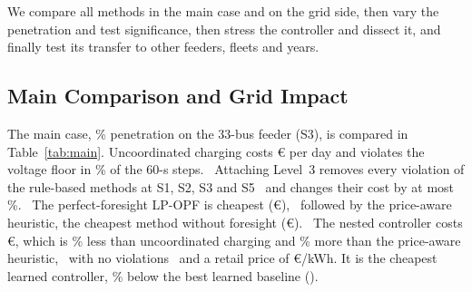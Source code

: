 
We compare all methods in the main case and on the grid side, then vary the
penetration and test significance, then stress the controller and dissect it,
and finally test its transfer to other feeders, fleets and years.

\begin{table}[t]
\centering
\caption{Results at S3 (240 Vehicles, 80\% Penetration; IEEE 33-Bus; \GEvalDays{} Held-Out Days; Learned Methods Averaged Over \GTrainSeedsWordCap{} Training Seeds). Cost: Mean Daily Cost With 95\% Bootstrap Confidence Interval; Cost/kWh and Retail in \euro/kWh; Other Metrics as Defined in Section~\ref{sec:metrics}; +L3: Level~3 Attached}
\label{tab:main}
\footnotesize

\end{table}

\subsection{Main Comparison and Grid Impact}
\label{sec:res-main}
The main case, \GPenSThree\% penetration on the 33-bus feeder (S3), is compared in
Table~\ref{tab:main}. Uncoordinated charging costs
\euro\GUncoordinatedSThreeCost{} per day and violates the voltage floor in
\GUncoordinatedSThreeViol\% of the 60-s steps.%
\ Attaching Level~3 removes every violation of the rule-based methods at
S1, S2, S3 and S5%
\ and changes their cost by at most \GLThreeCostChangeMax\%.%
\ The perfect-foresight LP-OPF is cheapest
(\euro\GLpOpfLThreeSThreeCost),%
\ followed by the price-aware heuristic, the cheapest method without foresight
(\euro\GPriceAwareLThreeSThreeCost).%
\ The nested controller costs \euro\GNestedSThreeCost, which is
\GSavingNestedUncSThree\% less than uncoordinated charging and
\GGapNestedPaSThree\% more than the price-aware heuristic,%
\ with no violations%
\ and a retail price of \euro\GNestedSThreeRetail/kWh. It is the cheapest
learned controller,
\GSavingNestedBestLearnedSThree\% below the best learned baseline
(\GBestLearnedSThree).%

\begin{table}[t]
\centering
\caption{Grid Side of S3: Mean Daily Peaks of EV and Feeder Load, Share of 60-s Steps With Level~3 Active, Reactive Energy, Curtailment and Power Flows per Day}
\label{tab:grid}
\footnotesize
\setlength{\tabcolsep}{2.4pt}

\end{table}

